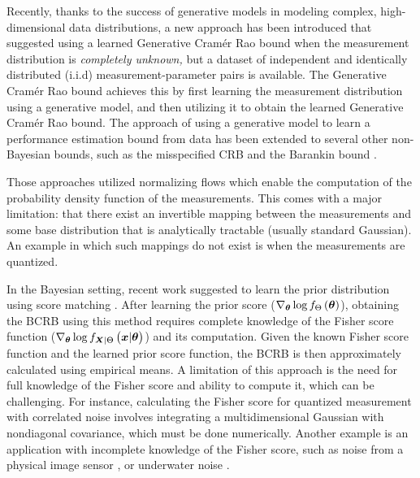 \documentclass[journal,twoside,web]{ieeecolor}
\begin{document}
Recently, thanks to the success of generative models in modeling complex, high-dimensional data distributions\cite{song2019generative,kobyzev2020normalizing}, a new approach has been introduced that suggested using a learned Generative Cram\'er Rao bound \cite{habi2023learning} when the measurement distribution is \emph{completely unknown,} but a dataset of independent and identically distributed  (i.i.d)  measurement-parameter pairs is available. The  Generative Cram\'er Rao bound \cite{habi2023learning} achieves this by first learning the measurement distribution using a generative model, and then utilizing it to obtain the learned Generative Cram\'er Rao bound. The approach of using a generative model to learn a performance estimation bound from data has been extended to several other non-Bayesian bounds, such as the misspecified CRB\cite{habi2023learned} and the Barankin bound \cite{habi2024learning}.  

Those approaches utilized normalizing flows\cite{kobyzev2020normalizing,papamakarios2021normalizing} which enable the computation of the probability density function of the measurements. This comes with a major limitation: that there exist an invertible mapping between the measurements and some base distribution that is analytically tractable (usually standard Gaussian). An example in which such mappings do not exist is when the measurements are quantized\cite{habi2022generative}. 

In %
the Bayesian setting, recent work \cite{crafts2023bayesian} suggested to learn the prior distribution using score matching \cite{hyvarinen2005estimation}. %
{After learning the prior score ($\nabla_{\bm{\theta}}\log f_{\Theta}\left(\bm{\theta}\right)$), obtaining the BCRB using this method requires complete {knowledge} of the Fisher score function ($\nabla_{\p}\log\probt{\x|\p}{\X|\pr}$) and its computation. {Given the known Fisher score function and the learned prior score function,} the BCRB is then approximately calculated using empirical means. A {limitation} of this approach is the need for  full knowledge of the Fisher score and ability to compute it, which can be challenging. For instance, calculating the Fisher score for quantized measurement with correlated noise involves integrating a multidimensional Gaussian with nondiagonal covariance, which must be done numerically. Another example is an application with incomplete knowledge of the Fisher score, such as noise from a physical image sensor \cite{abdelhamed2019noise}, or underwater noise \cite{weiss2023towards,msg0-ag12-22}.}
\end{document}
